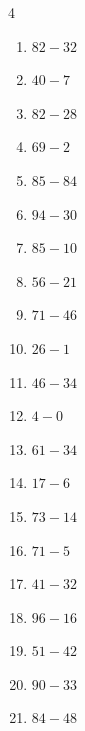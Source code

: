 \begin{multicols}{4}
\begin{enumerate}
  \item $82-32$
        \phantom{$=50$}

  \item $40-7$
        \phantom{$=33$}

\columnbreak %

\resetques

  \item $82-28$
        \phantom{$=54$}

  \item $69-2$
        \phantom{$=67$}

  \item $85-84$
        \phantom{$=1$}

  \item $94-30$
        \phantom{$=64$}

  \item $85-10$
        \phantom{$=75$}

  \item $56-21$
        \phantom{$=35$}

  \item $71-46$
        \phantom{$=25$}

  \item $26-1$
        \phantom{$=25$}

  \item $46-34$
        \phantom{$=12$}

  \item $4-0$
        \phantom{$=4$}

  \item $61-34$
        \phantom{$=27$}

  \item $17-6$
        \phantom{$=11$}

  \item $73-14$
        \phantom{$=59$}

  \item $71-5$
        \phantom{$=66$}

  \item $41-32$
        \phantom{$=9$}

  \item $96-16$
        \phantom{$=80$}

  \item $51-42$
        \phantom{$=9$}

  \item $90-33$
        \phantom{$=57$}

  \item $84-48$
        \phantom{$=36$}


\end{enumerate}
\end{multicols}
